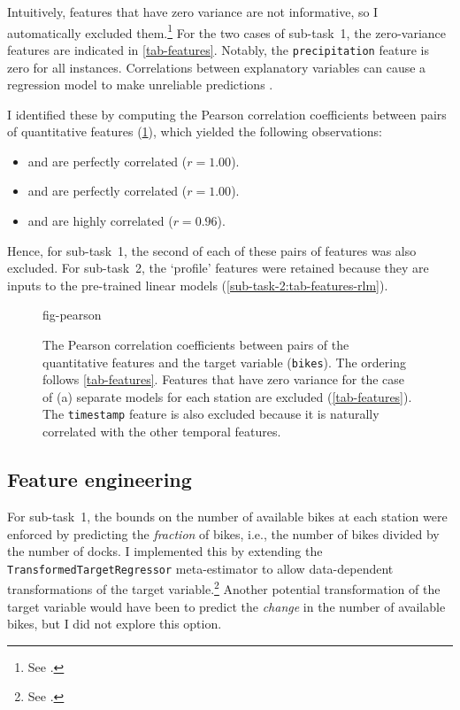 Intuitively, features that have zero variance are not informative, so I automatically
excluded them.\footnote{See .} For the
two cases of sub-task~1, the zero-variance features are indicated in
\cref{tab-features}.
Notably, the \texttt{precipitation} feature is zero for all instances.
Correlations between explanatory variables can cause a regression model to make
unreliable predictions \parencite{Alin2010}.
\begin{samepage}
  I identified these by computing the Pearson correlation
  coefficients between pairs of quantitative features (\cref{fig-pearson}), which
  yielded the following observations:
  \begin{itemize}
    \item \texttt{\bikesavgfull} and \texttt{\bikesavgshort} are perfectly correlated ($r = 1.00$).
    \item \texttt{\bikeshdiffavgfull} and \texttt{\bikeshdiffavgshort} are perfectly correlated ($r  = 1.00$).
    \item \texttt{\windspeedmax} and \texttt{\windspeedavg} are highly correlated ($r = 0.96$).
  \end{itemize}
\end{samepage}
Hence, for sub-task~1, the second of each of these pairs of features was also excluded.
For sub-task~2, the `profile' features were retained because they are inputs to the
pre-trained linear models (\cref{sub-task-2:tab-features-rlm}).

\begin{figure}
  \centering
  {fig-pearson}
  \caption{
    The Pearson correlation coefficients between pairs of the quantitative features and
    the target variable (\texttt{bikes}).
    The ordering follows \cref{tab-features}.
    Features that have zero variance for the case of (a) separate models for each station
    are excluded (\cref{tab-features}).
    The \texttt{timestamp} feature is also excluded because it is naturally correlated with
    the other temporal features.
  }
  \label{fig-pearson}
\end{figure}

\subsection{Feature engineering}
\label{sec:data-analysis:feature-engineering}

For sub-task~1, the bounds on the number of available bikes at each station were
enforced by predicting the \emph{fraction} of bikes, i.e., the number of bikes divided
by the number of docks.
I implemented this by extending the \texttt{TransformedTargetRegressor} meta-estimator
to allow data-dependent transformations of the target variable.\footnote{See
  .
}
Another potential transformation of the target variable would have been to predict the
\emph{change} in the number of available bikes, but I did not explore this option.

